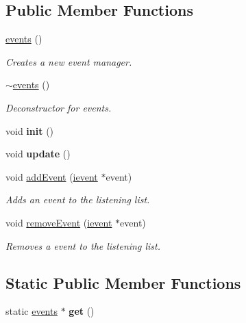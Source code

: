\subsection*{Public Member Functions}
\begin{DoxyCompactItemize}
\item 
\hyperlink{classflounder_1_1events_ae354f15876d95e28706b1d96dcd790af}{events} ()
\begin{DoxyCompactList}\small\item\em Creates a new event manager. \end{DoxyCompactList}\item 
\hyperlink{classflounder_1_1events_aaf446dc74703b8ce1c04f5cf8cb06eed}{$\sim$events} ()
\begin{DoxyCompactList}\small\item\em Deconstructor for events. \end{DoxyCompactList}\item 
\mbox{\label{classflounder_1_1events_ad51c30a5d072275fb54fad357bf763c7}} 
void {\bfseries init} ()
\item 
\mbox{\label{classflounder_1_1events_ac9735bc63eeda2d2af17586abbb5b95a}} 
void {\bfseries update} ()
\item 
void \hyperlink{classflounder_1_1events_a6cb8ff41cf2fbf6a92ca78c122f07eb9}{add\+Event} (\hyperlink{classflounder_1_1ievent}{ievent} $\ast$event)
\begin{DoxyCompactList}\small\item\em Adds an event to the listening list. \end{DoxyCompactList}\item 
void \hyperlink{classflounder_1_1events_a957a88d282b2caa50cc87bbe039de095}{remove\+Event} (\hyperlink{classflounder_1_1ievent}{ievent} $\ast$event)
\begin{DoxyCompactList}\small\item\em Removes a event to the listening list. \end{DoxyCompactList}\end{DoxyCompactItemize}
\subsection*{Static Public Member Functions}
\begin{DoxyCompactItemize}
\item 
\mbox{\label{classflounder_1_1events_aba09dc039ab9ddb860932a3f8d964f1e}} 
static \hyperlink{classflounder_1_1events}{events} $\ast$ {\bfseries get} ()
\end{DoxyCompactItemize}
